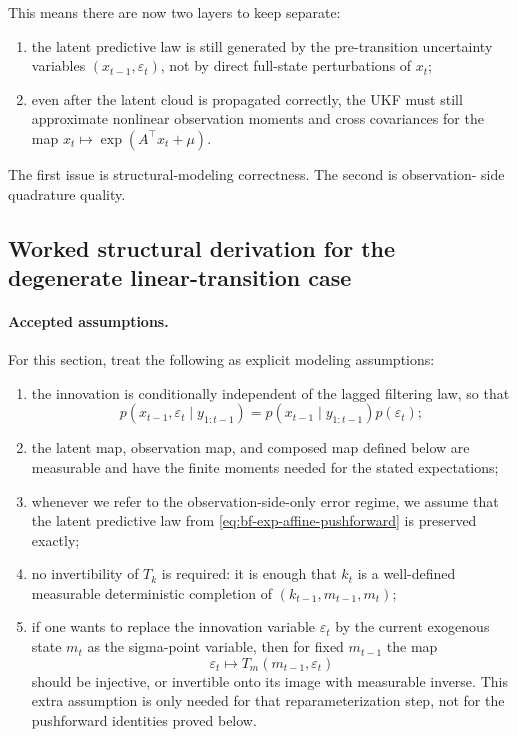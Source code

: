 This means there are now two layers to keep separate:
\begin{enumerate}[label=(\roman*)]
  \item the latent predictive law is still generated by the pre-transition
    uncertainty variables $(x_{t-1},\varepsilon_t)$, not by direct full-state
    perturbations of $x_t$;
  \item even after the latent cloud is propagated correctly, the UKF must still
    approximate nonlinear observation moments and cross covariances for the map
    $x_t \mapsto \exp(A^\top x_t + \mu)$.
\end{enumerate}
The first issue is structural-modeling correctness.  The second is observation-
side quadrature quality.

\subsection{Worked structural derivation for the degenerate linear-transition case}
\label{sec:bf-exp-affine-formal}

\paragraph{Accepted assumptions.}
For this section, treat the following as explicit modeling assumptions:
\begin{enumerate}[label=(A\arabic*)]
  \item the innovation is conditionally independent of the lagged filtering law,
    so that
    \begin{equation}
      p(x_{t-1},\varepsilon_t\mid y_{1:t-1})
      =
      p(x_{t-1}\mid y_{1:t-1})p(\varepsilon_t);
      \label{ass:bf-exp-affine-factorization}
    \end{equation}
  \item the latent map, observation map, and composed map defined below are
    measurable and have the finite moments needed for the stated expectations;
  \item whenever we refer to the observation-side-only error regime, we assume
    that the latent predictive law from
    \eqref{eq:bf-exp-affine-pushforward} is preserved exactly;
  \item no invertibility of $T_k$ is required: it is enough that $k_t$ is a
    well-defined measurable deterministic completion of
    $(k_{t-1},m_{t-1},m_t)$;
  \item if one wants to replace the innovation variable $\varepsilon_t$ by the
    current exogenous state $m_t$ as the sigma-point variable, then for fixed
    $m_{t-1}$ the map
    \begin{equation}
      \varepsilon_t \mapsto T_m(m_{t-1},\varepsilon_t)
      \label{ass:bf-exp-affine-Tm-reparameterization}
    \end{equation}
    should be injective, or invertible onto its image with measurable inverse.
    This extra assumption is only needed for that reparameterization step, not
    for the pushforward identities proved below.
\end{enumerate}


